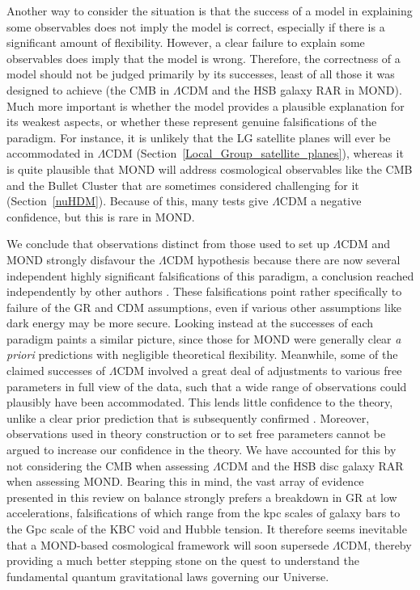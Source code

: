 \documentclass[fleqn,usenatbib,useAMS]{mnras} %
\begin{document}
Another way to consider the situation is that the success of a model in explaining some observables does not imply the model is correct, especially if there is a significant amount of flexibility. However, a clear failure to explain some observables does imply that the model is wrong. Therefore, the correctness of a model should not be judged primarily by its successes, least of all those it was designed to achieve (the CMB in $\Lambda$CDM and the HSB galaxy RAR in MOND). Much more important is whether the model provides a plausible explanation for its weakest aspects, or whether these represent genuine falsifications of the paradigm. For instance, it is unlikely that the LG satellite planes will ever be accommodated in $\Lambda$CDM (Section~\ref{Local_Group_satellite_planes}), whereas it is quite plausible that MOND will address cosmological observables like the CMB and the Bullet Cluster that are sometimes considered challenging for it (Section~\ref{nuHDM}). Because of this, many tests give $\Lambda$CDM a negative confidence, but this is rare in MOND.

We conclude that observations distinct from those used to set up $\Lambda$CDM and MOND strongly disfavour the $\Lambda$CDM hypothesis because there are now several independent highly significant falsifications of this paradigm, a conclusion reached independently by other authors \citep[e.g.][]{Kroupa_2010, Kroupa_2012, Kroupa_2015, Valentino_2021}. These falsifications point rather specifically to failure of the GR and CDM assumptions, even if various other assumptions like dark energy may be more secure. Looking instead at the successes of each paradigm paints a similar picture, since those for MOND were generally clear \emph{a priori} predictions with negligible theoretical flexibility. Meanwhile, some of the claimed successes of $\Lambda$CDM involved a great deal of adjustments to various free parameters in full view of the data, such that a wide range of observations could plausibly have been accommodated. This lends little confidence to the theory, unlike a clear prior prediction that is subsequently confirmed \citep{Merritt_2020}. Moreover, observations used in theory construction or to set free parameters cannot be argued to increase our confidence in the theory. We have accounted for this by not considering the CMB when assessing $\Lambda$CDM and the HSB disc galaxy RAR when assessing MOND. Bearing this in mind, the vast array of evidence presented in this review on balance strongly prefers a breakdown in GR at low accelerations, falsifications of which range from the kpc scales of galaxy bars to the Gpc scale of the KBC void and Hubble tension. It therefore seems inevitable that a MOND-based cosmological framework will soon supersede $\Lambda$CDM, thereby providing a much better stepping stone on the quest to understand the fundamental quantum gravitational laws governing our Universe.
\end{document}
